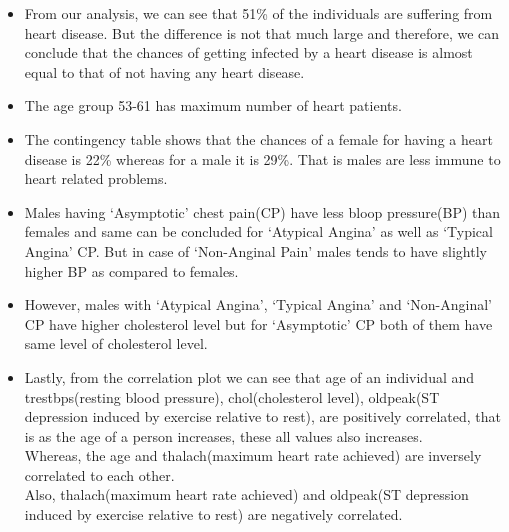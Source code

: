 \documentclass[
]{article}
\providecommand{\tightlist}{%
  \setlength{\itemsep}{0pt}\setlength{\parskip}{0pt}}
\begin{document}
\begin{itemize}
\tightlist
\item
  From our analysis, we can see that 51\% of the individuals are
  suffering from heart disease. But the difference is not that much
  large and therefore, we can conclude that the chances of getting
  infected by a heart disease is almost equal to that of not having any
  heart disease.\\
\item
  The age group 53-61 has maximum number of heart patients.\\
\item
  The contingency table shows that the chances of a female for having a
  heart disease is 22\% whereas for a male it is 29\%. That is males are
  less immune to heart related problems.
\item
  Males having `Asymptotic' chest pain(CP) have less bloop pressure(BP)
  than females and same can be concluded for `Atypical Angina' as well
  as `Typical Angina' CP. But in case of `Non-Anginal Pain' males tends
  to have slightly higher BP as compared to females.\\
\item
  However, males with `Atypical Angina', `Typical Angina' and
  `Non-Anginal' CP have higher cholesterol level but for `Asymptotic' CP
  both of them have same level of cholesterol level.\\
\item
  Lastly, from the correlation plot we can see that age of an individual
  and trestbps(resting blood pressure), chol(cholesterol level),
  oldpeak(ST depression induced by exercise relative to rest), are
  positively correlated, that is as the age of a person increases, these
  all values also increases.\\
  Whereas, the age and thalach(maximum heart rate achieved) are
  inversely correlated to each other.\\
  Also, thalach(maximum heart rate achieved) and oldpeak(ST depression
  induced by exercise relative to rest) are negatively correlated.
\end{itemize}
\end{document}
